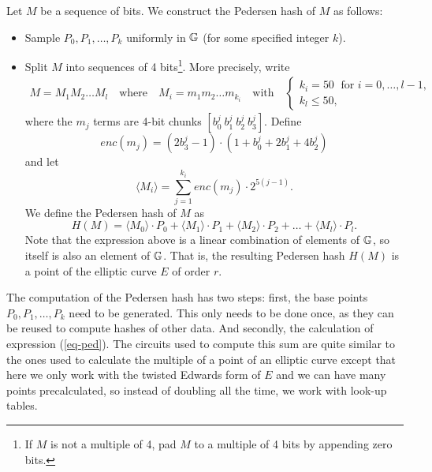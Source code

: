 
Let $M$ be a sequence of bits. We construct the Pedersen hash of $M$ as follows:
\begin{itemize}
	\item Sample $P_0,P_1,\dots,P_k$ uniformly in $\mathbb{G}$ (for some specified integer $k$). %
	\item   Split $M$ into sequences of 4 bits{\footnote{If $M$ is not a multiple of 4, pad $M$ to a multiple of 4 bits by appending zero bits.}}. 
	More precisely, write  
	\begin{gather*}
		M = M_1M_2\dots M_l 
		\quad\text{where}\quad
		M_i = m_1m_2\dots m_{k_i}
		\quad\text{with}\quad 
		\begin{cases}
			k_i = 50 	\;\text{ for }  i = 0, \dots, l-1, \\
			k_l \leq 50,
		\end{cases}
	\end{gather*}
	where the $m_j$ terms are 4-bit chunks $[b_0^j\: b_1^j\: b_2^j\: b_3^j]$. 
	Define  
	$$ enc(m_j) = (2b_3^j-1) 
		\cdot (1+b_{0}^j+2b_{1}^j+4b^j_{2}) $$
	and let 
	$$ \langle M_i \rangle = \sum_{j=1}^{k_i} enc(m_j) \cdot 2^{5(j-1)}.	$$
	We define the Pedersen hash of $M$ as
	\begin{equation}
	\label{eq-ped}
		H(M) = \langle M_0 \rangle \cdot P_0 
		+  \langle M_1 \rangle \cdot P_1 
		+  \langle M_2 \rangle \cdot P_2 
		+ \dots + \langle M_l \rangle \cdot P_l.	
	\end{equation}
	Note that the expression above is a linear combination of elements of $\mathbb{G}$, 
	so itself is also an element of $\mathbb{G}$. 
	That is, the resulting Pedersen hash $H(M)$ is a point of the elliptic curve $E$ of order $r$.
\end{itemize}

The computation of the Pedersen hash has two steps: first, the base points $P_0, P_1, \dots, P_k$ need to be generated. This only needs to be done once, as they can be reused to compute hashes of other data. And secondly, the calculation of expression (\ref{eq-ped}). The circuits used to compute this sum are quite similar to the ones used to calculate the multiple of a point of an elliptic curve except that here we only work with the twisted Edwards form of $E$ and we can have many points precalculated, so instead of doubling all the time, we work with look-up tables. 